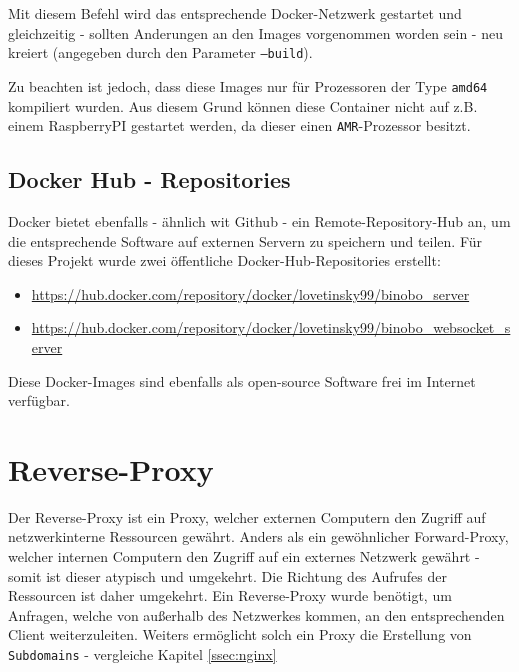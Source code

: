 \documentclass[paper=a4,12pt]{scrreprt}
\begin{document}
Mit diesem Befehl wird das entsprechende Docker-Netzwerk gestartet und gleichzeitig - sollten Anderungen an den Images vorgenommen worden sein - neu kreiert (angegeben durch den Parameter \texttt{--build}).\newline

Zu beachten ist jedoch, dass diese Images nur für Prozessoren der Type \texttt{amd64} kompiliert wurden. Aus diesem Grund können diese Container nicht auf z.B. einem RaspberryPI gestartet werden, da dieser einen \texttt{AMR}-Prozessor besitzt.\newline


\subsection{Docker Hub - Repositories}

Docker bietet ebenfalls - ähnlich wit Github - ein Remote-Repository-Hub an, um die entsprechende Software auf externen Servern zu speichern und teilen.\newline
Für dieses Projekt wurde zwei öffentliche Docker-Hub-Repositories erstellt:
\begin{itemize}
  \item \url{https://hub.docker.com/repository/docker/lovetinsky99/binobo_server}
  \item \url{https://hub.docker.com/repository/docker/lovetinsky99/binobo_websocket_server}
\end{itemize}

Diese Docker-Images sind ebenfalls als open-source Software frei im Internet verfügbar.\newline

\section{Reverse-Proxy}
\label{proxy}

Der Reverse-Proxy ist ein Proxy, welcher externen Computern den Zugriff auf netzwerkinterne Ressourcen gewährt. Anders als ein gewöhnlicher Forward-Proxy, welcher internen Computern den Zugriff auf ein externes Netzwerk gewährt - somit ist dieser atypisch und umgekehrt\cite{reverse_proxy}. Die Richtung des Aufrufes der Ressourcen ist daher umgekehrt.\newline
Ein Reverse-Proxy wurde benötigt, um Anfragen, welche von außerhalb des Netzwerkes kommen, an den entsprechenden Client weiterzuleiten. Weiters ermöglicht solch ein Proxy
die Erstellung von \texttt{Subdomains} - vergleiche Kapitel \ref{ssec:nginx}
\end{document}
